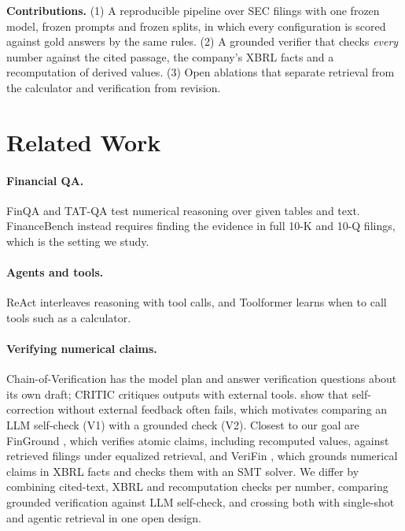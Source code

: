 \documentclass{article}
\begin{document}
\textbf{Contributions.} (1) A reproducible pipeline over \Filings{} SEC filings with one frozen model, frozen prompts and frozen splits, in which every configuration is scored against gold answers by the same rules. (2) A grounded verifier that checks \emph{every} number against the cited passage, the company's XBRL facts and a recomputation of derived values. (3) Open ablations that separate retrieval from the calculator and verification from revision.

\section{Related Work}
\paragraph{Financial QA.} FinQA \citep{chen2021finqa} and TAT-QA \citep{zhu2021tatqa} test numerical reasoning over given tables and text. FinanceBench \citep{islam2023financebench} instead requires finding the evidence in full 10-K and 10-Q filings, which is the setting we study.

\paragraph{Agents and tools.} ReAct \citep{yao2023react} interleaves reasoning with tool calls, and Toolformer \citep{schick2023toolformer} learns when to call tools such as a calculator.

\paragraph{Verifying numerical claims.} Chain-of-Verification \citep{dhuliawala2024cove} has the model plan and answer verification questions about its own draft; CRITIC \citep{gou2024critic} critiques outputs with external tools. \citet{huang2024cannot} show that self-correction without external feedback often fails, which motivates comparing an LLM self-check (V1) with a grounded check (V2). Closest to our goal are FinGround \citep{guo2026finground}, which verifies atomic claims, including recomputed values, against retrieved filings under equalized retrieval, and VeriFin \citep{hall2026verifin}, which grounds numerical claims in XBRL facts and checks them with an SMT solver. We differ by combining cited-text, XBRL and recomputation checks per number, comparing grounded verification against LLM self-check, and crossing both with single-shot and agentic retrieval in one open design.
\end{document}
